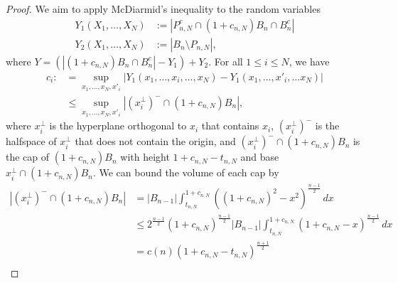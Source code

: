 \begin{proof}%
     We aim to apply McDiarmid's inequality to the  random variables
	\begin{align*}
	Y_1(X_1,\dots,X_N) &:=|P_{n,N}^c\cap(1+c_{n,N})B_n\cap B_n^c| \\%
	Y_2(X_1,\dots,X_N) &:=|B_n \setminus P_{n,N} |,
	\end{align*}
	where $Y = \left(|(1+c_{n,N})B_n\cap B_n^c| - Y_1\right) +Y_2$. For all $1\leq i\leq N$, we have %
% 	 
	\begin{align*}
	c_i:&=\sup_{x_1,\ldots,x_N,x'_i}|Y_1(x_1,\ldots,x_i,\ldots ,x_N) - Y_1(x_1,\ldots,x'_i,\ldots x_N)| \\
	&\leq \sup_{x_1,\ldots,x_N,x'_i} |(x_i^\perp)^{-}\cap (1+c_{n,N})B_n|,
	\end{align*}
	where $x_i^\perp$ is the hyperplane orthogonal to $x_i$ that contains $x_i$, $(x_i^\perp)^{-}$ is the halfspace of $x_i^\perp$ that does not contain the origin, and $(x_i^\perp)^{-}\cap (1+c_{n,N})B_n$ is the cap of $(1+c_{n,N})B_n$ with height $1+c_{n,N}-t_{n,N}$ and base $x_i^\perp\cap(1+c_{n,N})B_n$.
	We can bound the volume of each cap by %
	\begin{align*}|(x_{i}^{\perp})^{-}\cap(1+c_{n,N})B_n| & =|B_{n-1}|\int_{t_{n,N}}^{1+c_{n,N}}\left((1+c_{n,N})^{2}-x^{2}\right)^{\frac{n-1}{2}}\,dx\\
	& \leq2^{\frac{n-1}{2}}(1+c_{n,N})^{\frac{n-1}{2}}|B_{n-1}|\int_{t_{n,N}}^{1+c_{n,N}}(1+c_{n,N}-x)^{\frac{n-1}{2}}\,dx\\
	&=c(n)(1+c_{n,N}-t_{n,N})^{\frac{n+1}{2}}\\

\end{align*}
\end{proof}
